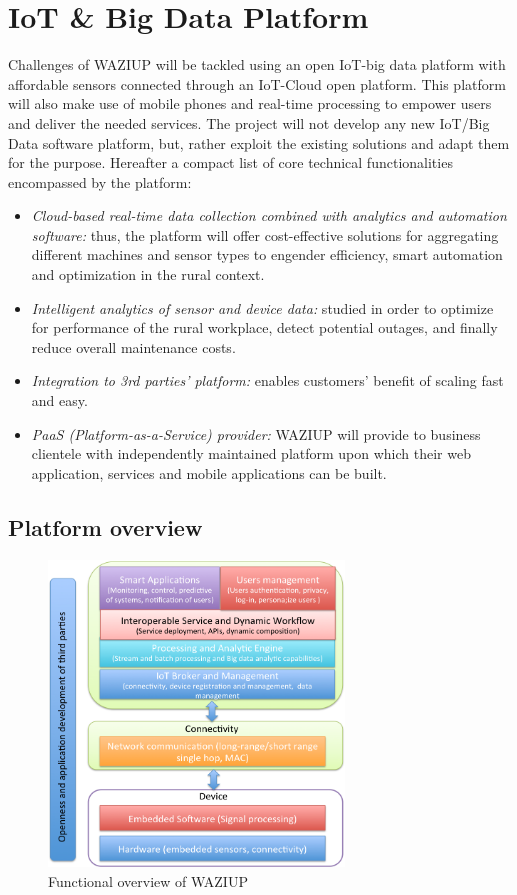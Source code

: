 
\section{IoT \& Big Data Platform}

Challenges of WAZIUP will be tackled using an open IoT-big data platform with affordable sensors connected through an IoT-Cloud open platform.
This platform will also make use of mobile phones and real-time processing to empower users and deliver the needed services.
The project will not develop any new IoT/Big Data software platform, but, rather exploit the existing solutions and adapt them for the purpose. Hereafter a compact list of core technical functionalities encompassed by the platform:

\begin{itemize}
   \item \emph{Cloud-based real-time data collection combined with analytics and automation software:} thus, the platform will offer cost-effective solutions for aggregating different machines and sensor types to engender efficiency, smart automation and optimization in the rural context.
   \item \emph{Intelligent analytics of sensor and device data:} studied in order to optimize for performance of the rural workplace, detect potential outages, and finally reduce overall maintenance costs.
   \item \emph{Integration to 3rd parties' platform:} enables customers' benefit of scaling fast and easy.
   \item \emph{PaaS (Platform-as-a-Service) provider:} WAZIUP will provide to business clientele with independently maintained platform upon which their web application, services and mobile applications can be built.
\end{itemize}

\subsection{Platform overview}


\begin{figure}[h!]
\centering
\includegraphics[width=0.7\textwidth]{figs/functional.png}
\caption{Functional overview of WAZIUP}
\label{fig:func}
\end{figure}

